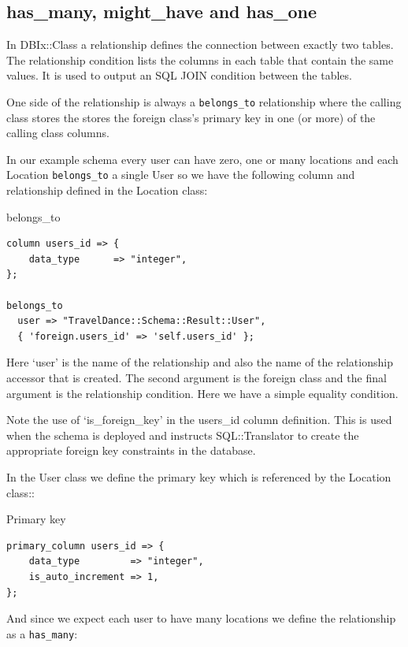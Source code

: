 \subsection{has\_many, might\_have and has\_one}

In DBIx::Class a relationship defines the connection between exactly two
tables. The relationship condition lists the columns in each table that
contain the same values. It is used to output an SQL JOIN condition between
the tables.

One side of the relationship is always a \verb|belongs_to| relationship
where the calling class stores the stores the foreign class’s primary key in
one (or more) of the calling class columns.

In our example schema every user can have zero, one or many locations and
each Location \verb|belongs_to| a single User so we have the following column and
relationship defined in the Location class: 
 
\begin{frame}[fragile]{belongs\_to}
\begin{lstlisting}
column users_id => {
    data_type      => "integer",
};

belongs_to
  user => "TravelDance::Schema::Result::User",
  { 'foreign.users_id' => 'self.users_id' };
\end{lstlisting}
\end{frame}

Here ‘user’ is the name of the relationship and also the name of the relationship accessor that is created. The second argument is the foreign class and the final argument is the relationship condition. Here we have a simple equality condition.

Note the use of ‘is\_foreign\_key’ in the users\_id column definition. This is used when the schema is deployed and instructs SQL::Translator to create the appropriate foreign key constraints in the database.

In the User class we define the primary key which is referenced by the Location class::

\begin{frame}[fragile]{Primary key}
\begin{lstlisting}
primary_column users_id => {
    data_type         => "integer",
    is_auto_increment => 1,
};
\end{lstlisting}
\end{frame}

And since we expect each user to have many locations we define the relationship as a \verb|has_many|:

